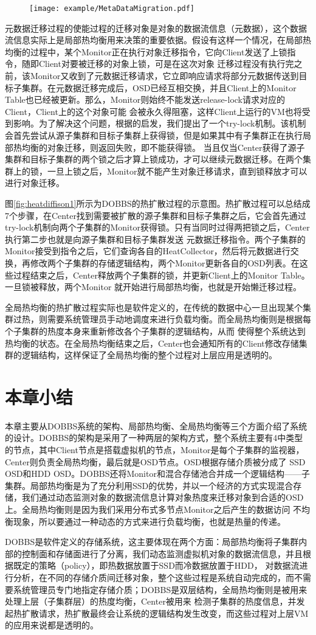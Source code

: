 \begin{figure}[!htp]
    \centering
    \texttt{[image: example/MetaDataMigration.pdf]}
\end{figure}

元数据迁移过程的使能过程的迁移对象是对象的数据流信息（元数据），这个数据流信息实际上是局部热均衡用来决策的重要依据。假设有这样一个情况，在局部热均衡的过程中，某个Monitor正在执行对象迁移指令，它向Client发送了上锁指令，随即Client对要被迁移的对象上锁，可是在这次对象
迁移过程没有执行完之前，该Monitor又收到了元数据迁移请求，它立即响应请求将部分元数据传送到目标子集群。在元数据迁移完成后，OSD已经互相交换，并且Client上的Monitor Table也已经被更新。那么，Monitor则始终不能发送release-lock请求对应的Client，Client上的这个对象可能
会被永久得阻塞，这样Client上运行的VM也将受到影响。为了解决这个问题，根据的启发，我们提出了一个try-lock机制。该机制会首先尝试从源子集群和目标子集群上获得锁，但是如果其中有子集群正在执行局部热均衡的对象迁移，则返回失败，即不能获得锁。
当且仅当Center获得了源子集群和目标子集群的两个锁之后才算上锁成功，才可以继续元数据迁移。在两个集群上的锁，一旦上锁之后，Monitor就不能产生对象迁移请求，直到锁释放才可以进行对象迁移。

图\ref{fig:heatdiffison1}所示为DOBBS的热扩散过程的示意图。热扩散过程可以总结成7个步骤，在Center找到需要被扩散的源子集群和目标子集群之后，它会首先通过try-lock机制向两个子集群的Monitor获得锁。只有当同时过得两把锁之后，Center执行第二步也就是向源子集群和目标子集群发送
元数据迁移指令。两个子集群的Monitor接受到指令之后，它们查询各自的HeatCollector，然后将元数据进行交换，再修改两个子集群的存储逻辑结构，两个Monitor更新各自的OSD列表。在这些过程结束之后，Center释放两个子集群的锁，并更新Client上的Monitor Table。一旦锁被释放，两个Monitor
就开始进行局部热均衡，也就是开始懒迁移过程。

全局热均衡的热扩散过程实际也是软件定义的，在传统的数据中心一旦出现某个集群过热，则需要系统管理员手动地调度来进行负载均衡。而全局热均衡则是根据每个子集群的热度本身来重新修改各个子集群的逻辑结构，从而
使得整个系统达到热均衡的状态。在全局热均衡结束之后，Center也会通知所有的Client修改存储集群的逻辑结构，这样保证了全局热均衡的整个过程对上层应用是透明的。

\section{本章小结}
本章主要从DOBBS系统的架构、局部热均衡、全局热均衡等三个方面介绍了系统的设计。DOBBS的架构是采用了一种两层的架构方式，整个系统主要有4中类型的节点，其中Client节点是搭载虚拟机的节点，Monitor是每个子集群的监视器，Center则负责全局热均衡，最后就是OSD节点。OSD根据存储介质被分成了
SSD OSD和HDD OSD。DOBBS还将Monitor和混合存储池合并成一个逻辑结构——子集群。局部热均衡是为了充分利用SSD的优势，并以一个经济的方式实现混合存储，我们通过动态监测对象的数据流信息计算对象热度来迁移对象到合适的OSD上。全局热均衡则是因为我们采用分布式多节点Monitor之后产生的数据访问
不均衡现象，所以要通过一种动态的方式来进行负载均衡，也就是热量的传递。

DOBBS是软件定义的存储系统，这主要体现在两个方面：局部热均衡将子集群内部的控制面和存储面进行了分离，我们动态监测虚拟机对象的数据流信息，并且根据既定的策略（policy），即热数据放置于SSD而冷数据放置于HDD，
对数据流进行分析，在不同的存储介质间迁移对象，整个这些过程是系统自动完成的，而不需要系统管理员专门地指定存储介质；DOBBS是双层结构，全局热均衡则是被用来处理上层（子集群层）的热度均衡，Center被用来
检测子集群的热度信息，并发起热扩散请求，热扩散最终会让系统的逻辑结构发生改变，而这些过程对上层VM的应用来说都是透明的。
